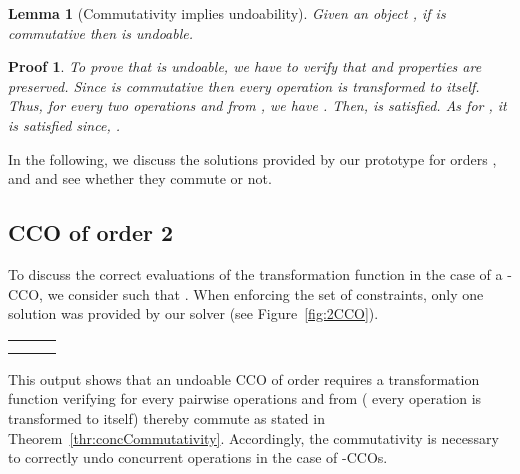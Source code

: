 \documentclass[submission,copyright,creativecommons]{eptcs}
\newtheorem{lemma}{Lemma}
\newtheorem*{proof*}{Proof}\newtheorem{theorem}{Theorem}
\begin{document}
\begin{lemma}[Commutativity implies undoability]\label{lemm:commRev}
Given an object , 
if  is commutative then  is undoable. 
\end{lemma}

\begin{proof*}To prove that  is undoable, we  have to verify that  and  properties are preserved.
Since  is commutative then every operation is transformed to itself. Thus, for every two operations  and  from ,  we have
. 
 Then,   is satisfied.
As for , it is satisfied since,
.
\end{proof*}

In the following, we discuss the solutions provided by our prototype for orders ,  and  and see whether they commute or not. 
\subsection{CCO of order 2}
To discuss the correct evaluations of the transformation function  in the case of a -CCO, we consider   such that . 
When enforcing the set of constraints, only one solution was provided by our solver (see Figure~\ref{fig:2CCO}).
\begin{table*}[htbp]

      \centering \begin{small} 
      \begin{tabular}{|c|c|c|}
\hline
&   &     \\ \hline
&  & \\ \hline 
 &  & \\ \hline 
\end{tabular}
\end{small}
   \label{fig:2CCO}
\end{table*}
\vspace{-.4cm} 
 This output shows that an undoable CCO of order   requires a transformation function verifying    for every pairwise operations  and  from 
 ( every operation is transformed to itself) thereby  commute as stated in Theorem~\ref{thr:concCommutativity}. Accordingly,   the commutativity is necessary to correctly undo concurrent operations in the case of -CCOs.







 
\end{document}
